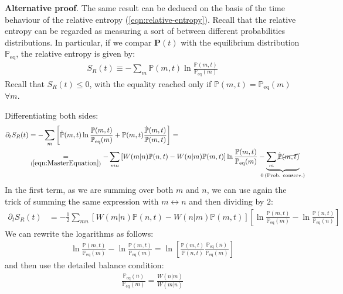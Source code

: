 \documentclass[../../main.tex]{subfiles}
\begin{document}
\textbf{Alternative proof}. The same result can be deduced on the basis of the time behaviour of the relative entropy (\ref{eqn:relative-entropy}). Recall that the relative entropy can be regarded as measuring a sort of  between different probabilities distributions. In particular, if we compar $\bm{P}(t)$ with the equilibrium distribution $\mathbb{P}_{\mathrm{eq}}$, the relative entropy is given by:
\begin{align*}
    S_R(t) \equiv - \sum_m \mathbb{P}(m,t) \ln \frac{\mathbb{P}(m,t)}{\mathbb{P}_{\mathrm{eq}}(m)} 
\end{align*} 
Recall that $S_R(t) \leq 0$, with the equality reached only if $\mathbb{P}(m,t) = \mathbb{P}_{\mathrm{eq}}(m)$ $\forall m$.

\medskip

Differentiating both sides:
\begin{align*}
    \partial_t S_R(t) &= -\sum_m \left[\dot{\mathbb{P}}(m,t) \ln \frac{\mathbb{P}(m,t)}{\mathbb{P}_{\mathrm{eq}}(m)} + \mathbb{P}(m,t) \frac{\dot{\mathbb{P}}(m,t)}{\mathbb{P}(m,t)} \right] =\\
    &\underset{(\ref{eqn:MasterEquation})}{=}  -\sum_{mn} \left[W(m|n) \mathbb{P}(n,t) - W(n|m)\mathbb{P}(m,t)\right] \ln \frac{\mathbb{P}(m,t)}{\mathbb{P}_{\mathrm{eq}}(m)} - \underbrace{\sum_m \cancel{\dot{\mathbb{P}}(m,t)}}_{\mathclap{0 \> (\text{Prob. conserv.})}} 
\end{align*}
In the first term, as we are summing over both $m$ and $n$, we can use again the trick of summing the same expression with $m \leftrightarrow n$ and then dividing by $2$:
\begin{align*}
    \partial_t S_R(t) &= -\frac{1}{2} \sum_{mn} \left[W(m|n)\mathbb{P}(n,t) - W(n|m) \mathbb{P}(m,t)\right] \left[\ln \frac{\mathbb{P}(m,t)}{\mathbb{P}_{\mathrm{eq}}(m)} - \ln \frac{\mathbb{P}(n,t)}{\mathbb{P}_{\mathrm{eq}}(n)}  \right]
\end{align*}
We can rewrite the logarithms as follows:
\begin{align*}
    \ln \frac{\mathbb{P}(m,t)}{\mathbb{P}_{\mathrm{eq}}(m)} - \ln \frac{\mathbb{P}(m,t)}{\mathbb{P}_{\mathrm{eq}}(m)} = \ln \left[\frac{\mathbb{P}(m,t)}{\mathbb{P}(n,t)} \frac{\mathbb{P}_{\mathrm{eq}}(n)}{\mathbb{P}_{\mathrm{eq}}(m)} \right]
\end{align*}
and then use the detailed balance condition:
\begin{align*}
    \frac{\mathbb{P}_{\mathrm{eq}}(n)}{\mathbb{P}_{\mathrm{eq}}(m)}  = \frac{W(n|m)}{W(m|n)} 
\end{align*}
\end{document}

